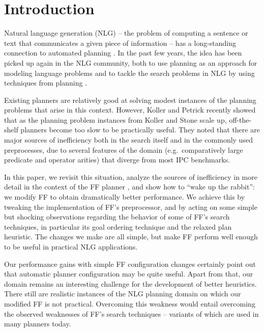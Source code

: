 
\section{Introduction} \label{sec:introduction}

Natural language generation (NLG) -- the problem of computing a
sentence or text that communicates a given piece of information -- has
a long-standing connection to automated planning
\cite{perrault80,appelt:planning}. In the past few years, the idea has
been picked up again in the NLG community, both to use planning as an
approach for modeling language problems
\cite{Steedman-Petrick:07,benotti08b} and to tackle the search
problems in NLG by using techniques from planning \cite{KolSto07}.

Existing planners are relatively good at solving modest instances of
the planning problems that arise in this context. However, Koller and
Petrick 
recently showed that as the planning problem instances from Koller and
Stone  scale up, off-the-shelf planners become too
slow to be practically useful. They noted that there are major sources
of inefficiency both in the search itself and in the commonly used
preprocesses, due to several features of the domain
(e.g.\ comparatively large predicate and operator arities) that
diverge from most IPC benchmarks.

In this paper, we revisit this situation, analyze the sources of
inefficiency in more detail in the context of the FF planner
\cite{HoffmannNebel01}, and show how to ``wake up the rabbit'': we
modify FF to obtain dramatically better performance. We achieve this
by tweaking the implementation of FF's preprocessor, and by acting on
some simple but shocking observations regarding the behavior of some
of FF's search techniques, in particular its goal ordering technique
and the relaxed plan heuristic. The changes we make are all simple,
but make FF perform well enough to be useful in practical NLG
applications.



Our performance gains with simple FF configuration changes certainly
point out that automatic planner configuration may be quite
useful. Apart from that, our domain remains an interesting challenge
for the development of better heuristics. There still are realistic
instances of the NLG planning domain on which our modified FF is not
practical. Overcoming this weakness would entail overcoming the
observed weaknesses of FF's search techniques -- variants of which are
used in many planners today.


